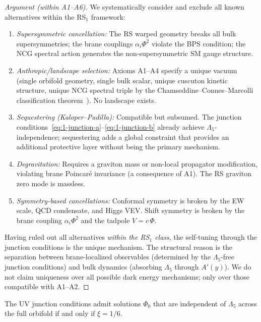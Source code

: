 \begin{proof}[Argument (within A1--A6)]
We systematically consider and exclude all known alternatives within the RS$_1$ framework:
\begin{enumerate}
\item \emph{Supersymmetric cancellation:} The RS warped geometry breaks all bulk supersymmetries; the brane couplings $\alpha_i\Phi^2$ violate the BPS condition; the NCG spectral action generates the non-supersymmetric SM gauge structure.
\item \emph{Anthropic/landscape selection:} Axioms A1--A4 specify a unique vacuum (single orbifold geometry, single bulk scalar, unique cuscuton kinetic structure, unique NCG spectral triple by the Chamseddine--Connes--Marcolli classification theorem~\cite{ch1:chamseddine-connes-marcolli}). No landscape exists.
\item \emph{Sequestering (Kaloper--Padilla):} Compatible but subsumed. The junction conditions~\eqref{eq:1-junction-a}--\eqref{eq:1-junction-b} already achieve $\Lambda_5$-independence; sequestering adds a global constraint that provides an additional protective layer without being the primary mechanism.
\item \emph{Degravitation:} Requires a graviton mass or non-local propagator modification, violating brane Poincar\'{e} invariance (a consequence of A1). The RS graviton zero mode is massless.
\item \emph{Symmetry-based cancellations:} Conformal symmetry is broken by the EW scale, QCD condensate, and Higgs VEV. Shift symmetry is broken by the brane coupling $\alpha_i\Phi^2$ and the tadpole $V = c\,\Phi$.
\end{enumerate}
Having ruled out all alternatives \emph{within the RS$_1$ class}, the self-tuning through the junction conditions is the unique mechanism. The structural reason is the separation between brane-localized observables (determined by the $\Lambda_5$-free junction conditions) and bulk dynamics (absorbing $\Lambda_5$ through $A'(y)$). We do not claim uniqueness over all possible dark energy mechanisms; only over those compatible with A1--A2. \qedhere
\end{proof}

\begin{proposition}[Necessity of $\xi = 1/6$]
\label{thm:1-xi-necessity}
The UV junction conditions admit solutions $\Phi_0$ that are independent of $\Lambda_5$ across the full orbifold if and only if $\xi = 1/6$.
\end{proposition}

